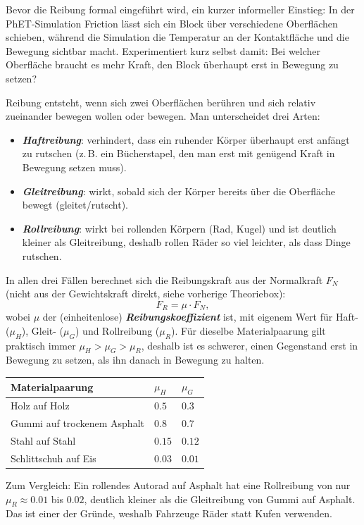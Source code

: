 \documentclass[addpoints,11pt,a4paper]{exam}
\begin{document}
\begin{hinweisbox}
Bevor die Reibung formal eingeführt wird, ein kurzer informeller
Einstieg: In der PhET-Simulation \glqq Friction\grqq{} lässt sich ein
Block über verschiedene Oberflächen schieben, während die Simulation die
Temperatur an der Kontaktfläche und die Bewegung sichtbar macht.
Experimentiert kurz selbst damit: Bei welcher Oberfläche braucht es mehr
Kraft, den Block überhaupt erst in Bewegung zu setzen?
\end{hinweisbox}

\begin{theoriebox}
Reibung entsteht, wenn sich zwei Oberflächen berühren und sich relativ
zueinander bewegen wollen oder bewegen. Man unterscheidet drei Arten:

\begin{itemize}[leftmargin=1.2cm,itemsep=0.3em]
  \item \textbf{\emph{Haftreibung}}: verhindert, dass ein ruhender Körper
  überhaupt erst anfängt zu rutschen (z.\,B. ein Bücherstapel, den man
  erst mit genügend Kraft in Bewegung setzen muss).
  \item \textbf{\emph{Gleitreibung}}: wirkt, sobald sich der Körper
  bereits über die Oberfläche bewegt (gleitet/rutscht).
  \item \textbf{\emph{Rollreibung}}: wirkt bei rollenden Körpern (Rad,
  Kugel) und ist deutlich kleiner als Gleitreibung, deshalb rollen Räder
  so viel leichter, als dass Dinge rutschen.
\end{itemize}

In allen drei Fällen berechnet sich die Reibungskraft aus der Normalkraft
$F_N$ (nicht aus der Gewichtskraft direkt, siehe vorherige Theoriebox):
\[
  \boxed{F_R = \mu\cdot F_N},
\]
wobei $\mu$ der (einheitenlose) \textbf{\emph{Reibungskoeffizient}} ist,
mit eigenem Wert für Haft- ($\mu_H$), Gleit- ($\mu_G$) und Rollreibung
($\mu_R$). Für dieselbe Materialpaarung gilt praktisch immer
$\mu_H > \mu_G > \mu_R$, deshalb ist es schwerer, einen Gegenstand erst
in Bewegung zu setzen, als ihn danach in Bewegung zu halten.

\begin{center}
\begin{tabular}{@{}lll@{}}
\toprule
\textbf{Materialpaarung} & \textbf{$\mu_H$} & \textbf{$\mu_G$} \\
\midrule
Holz auf Holz & $0.5$ & $0.3$ \\
Gummi auf trockenem Asphalt & $0.8$ & $0.7$ \\
Stahl auf Stahl & $0.15$ & $0.12$ \\
Schlittschuh auf Eis & $0.03$ & $0.01$ \\
\bottomrule
\end{tabular}
\end{center}

Zum Vergleich: Ein rollendes Autorad auf Asphalt hat eine Rollreibung von
nur $\mu_R\approx 0.01$ bis $0.02$, deutlich kleiner als die Gleitreibung
von Gummi auf Asphalt. Das ist einer der Gründe, weshalb Fahrzeuge Räder
statt Kufen verwenden.
\end{theoriebox}
\end{document}
